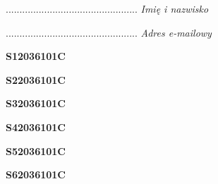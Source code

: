 \begin{turn}{90}\begin{minipage}{\linewidth} \vspace{20mm} ................................................  \textit{Imię i nazwisko}\end{minipage}\end{turn}

\begin{turn}{90}\begin{minipage}{\linewidth} \vspace{20mm} ................................................  \textit{Adres e-mailowy}\end{minipage}\end{turn}

\begin{turn}{90}\huge \begin{minipage}{\linewidth} \vspace{10mm}\textbf{S12036101C}\end{minipage}\end{turn}

\begin{turn}{90}\huge \begin{minipage}{\linewidth} \vspace{10mm}\textbf{S22036101C}\end{minipage}\end{turn}

\begin{turn}{90}\huge \begin{minipage}{\linewidth} \vspace{10mm}\textbf{S32036101C}\end{minipage}\end{turn}

\begin{turn}{90}\huge \begin{minipage}{\linewidth} \vspace{10mm}\textbf{S42036101C}\end{minipage}\end{turn}

\begin{turn}{90}\huge \begin{minipage}{\linewidth} \vspace{10mm}\textbf{S52036101C}\end{minipage}\end{turn}

\begin{turn}{90}\huge \begin{minipage}{\linewidth} \vspace{10mm}\textbf{S62036101C}\end{minipage}\end{turn}

